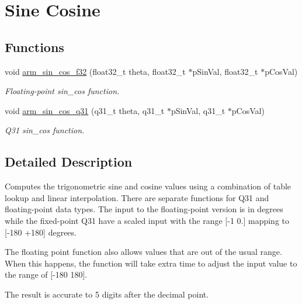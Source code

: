 \hypertarget{group__SinCos}{}\section{Sine Cosine}
\label{group__SinCos}
\subsection*{Functions}
\begin{DoxyCompactItemize}
\item 
void \hyperlink{group__SinCos_ga4420d45c37d58c310ef9ae1b5fe58020}{arm\+\_\+sin\+\_\+cos\+\_\+f32} (float32\+\_\+t theta, float32\+\_\+t $\ast$p\+Sin\+Val, float32\+\_\+t $\ast$p\+Cos\+Val)
\begin{DoxyCompactList}\small\item\em Floating-\/point sin\+\_\+cos function. \end{DoxyCompactList}\item 
void \hyperlink{group__SinCos_gae9e4ddebff9d4eb5d0a093e28e0bc504}{arm\+\_\+sin\+\_\+cos\+\_\+q31} (q31\+\_\+t theta, q31\+\_\+t $\ast$p\+Sin\+Val, q31\+\_\+t $\ast$p\+Cos\+Val)
\begin{DoxyCompactList}\small\item\em Q31 sin\+\_\+cos function. \end{DoxyCompactList}\end{DoxyCompactItemize}


\subsection{Detailed Description}
Computes the trigonometric sine and cosine values using a combination of table lookup and linear interpolation. There are separate functions for Q31 and floating-\/point data types. The input to the floating-\/point version is in degrees while the fixed-\/point Q31 have a scaled input with the range \mbox{[}-\/1 0.\mbox{]} mapping to \mbox{[}-\/180 +180\mbox{]} degrees.

The floating point function also allows values that are out of the usual range. When this happens, the function will take extra time to adjust the input value to the range of \mbox{[}-\/180 180\mbox{]}.

The result is accurate to 5 digits after the decimal point.

